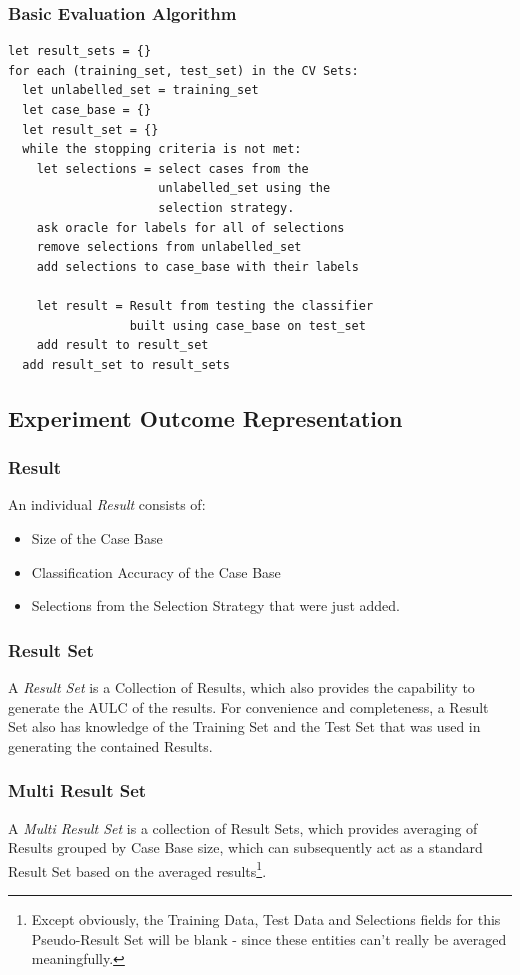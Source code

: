 \documentclass[a4paper,11pt]{report}
\begin{document}
\subsubsection{Basic Evaluation Algorithm}
\begin{samepage}
\begin{verbatim}
let result_sets = {}
for each (training_set, test_set) in the CV Sets:
  let unlabelled_set = training_set
  let case_base = {}
  let result_set = {}
  while the stopping criteria is not met:
    let selections = select cases from the 
                     unlabelled_set using the 
                     selection strategy.
    ask oracle for labels for all of selections
    remove selections from unlabelled_set
    add selections to case_base with their labels
  
    let result = Result from testing the classifier
                 built using case_base on test_set
    add result to result_set
  add result_set to result_sets
\end{verbatim}
\end{samepage}

\subsection{Experiment Outcome Representation}
\subsubsection{Result}
An individual \emph{Result} consists of:
\begin{itemize}
	\item Size of the Case Base
	\item Classification Accuracy of the Case Base
	\item Selections from the Selection Strategy that were just added.
\end{itemize}

\subsubsection{Result Set}
A \emph{Result Set} is a Collection of Results, which also provides the capability to generate the AULC of the results. For convenience and completeness, a Result Set also has knowledge of the Training Set and the Test Set that was used in generating the contained Results.

\subsubsection{Multi Result Set}
A \emph{Multi Result Set} is a collection of Result Sets, which provides averaging of Results grouped by Case Base size, which can subsequently act as a standard Result Set based on the averaged results\footnote{Except obviously, the Training Data, Test Data and Selections fields for this Pseudo-Result Set will be blank - since these entities can't really be averaged meaningfully.}.
\end{document}
